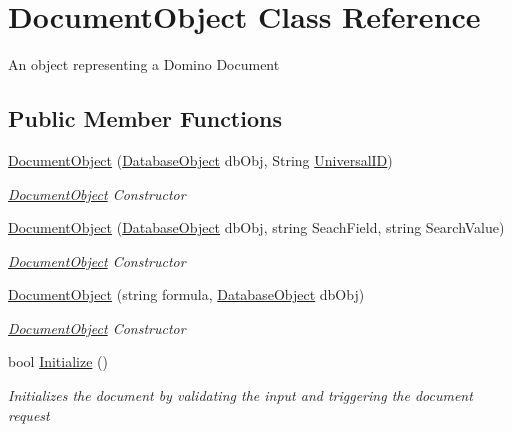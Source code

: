\hypertarget{class_document_object}{}\section{Document\+Object Class Reference}
\label{class_document_object}


An object representing a Domino Document  


\subsection*{Public Member Functions}
\begin{DoxyCompactItemize}
\item 
\mbox{\hyperlink{class_document_object_a46c89e7d40b15a91542a5482b2d8a084}{Document\+Object}} (\mbox{\hyperlink{class_database_object}{Database\+Object}} db\+Obj, String \mbox{\hyperlink{class_document_object_a8b96d04632a2802e7cc5466ca5cee8cf}{Universal\+ID}})
\begin{DoxyCompactList}\small\item\em \mbox{\hyperlink{class_document_object}{Document\+Object}} Constructor \end{DoxyCompactList}\item 
\mbox{\hyperlink{class_document_object_a7c98c6485f7395697561500a8ff42d79}{Document\+Object}} (\mbox{\hyperlink{class_database_object}{Database\+Object}} db\+Obj, string Seach\+Field, string Search\+Value)
\begin{DoxyCompactList}\small\item\em \mbox{\hyperlink{class_document_object}{Document\+Object}} Constructor \end{DoxyCompactList}\item 
\mbox{\hyperlink{class_document_object_a4eb6c7aaa4774d1d5dbf5bf17dff23d9}{Document\+Object}} (string formula, \mbox{\hyperlink{class_database_object}{Database\+Object}} db\+Obj)
\begin{DoxyCompactList}\small\item\em \mbox{\hyperlink{class_document_object}{Document\+Object}} Constructor \end{DoxyCompactList}\item 
bool \mbox{\hyperlink{class_document_object_af4298d6cfbb9ea60643d9995309b73f1}{Initialize}} ()
\begin{DoxyCompactList}\small\item\em Initializes the document by validating the input and triggering the document request \end{DoxyCompactList}\item 

\end{DoxyCompactItemize}
